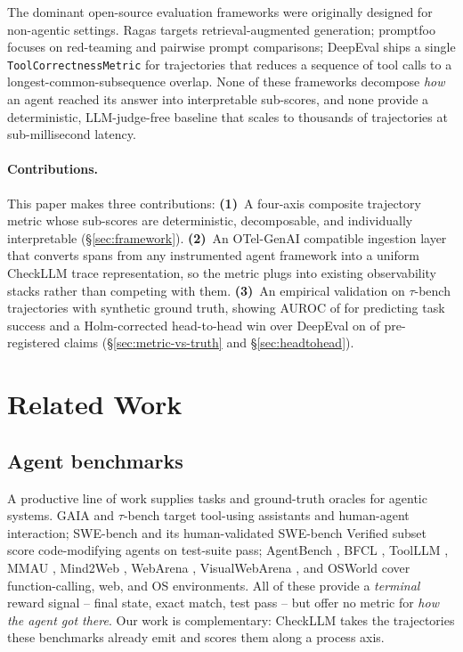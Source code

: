 \documentclass{article}
\begin{document}
The dominant open-source evaluation frameworks were originally
designed for non-agentic settings. Ragas \citep{es2024ragas} targets
retrieval-augmented generation; promptfoo \citep{promptfoo2024} focuses
on red-teaming and pairwise prompt comparisons; DeepEval
\citep{confidentai2024deepeval} ships a single
\texttt{ToolCorrectnessMetric} for trajectories that reduces a sequence
of tool calls to a longest-common-subsequence overlap. None of these
frameworks decompose \emph{how} an agent reached its answer into
interpretable sub-scores, and none provide a deterministic,
LLM-judge-free baseline that scales to thousands of trajectories at
sub-millisecond latency.

\paragraph{Contributions.} This paper makes three contributions:
\textbf{(1)}~A four-axis composite trajectory metric whose sub-scores
are deterministic, decomposable, and individually interpretable
(\S\ref{sec:framework}). \textbf{(2)}~An OTel-GenAI compatible
\citep{otelgenai2024} ingestion layer that converts spans from any
instrumented agent framework into a uniform CheckLLM trace
representation, so the metric plugs into existing observability stacks
rather than competing with them. \textbf{(3)}~An empirical validation
on \NTrajectories{} $\tau$-bench \citep{yao2024taubench} trajectories
with synthetic ground truth, showing AUROC of \AurocOverall{} for
predicting task success and a Holm-corrected
\citep{holm1979multiple} head-to-head win over DeepEval on
\HHClaimsSignificant{} of \HHClaimsCount{} pre-registered claims
(\S\ref{sec:metric-vs-truth} and \S\ref{sec:headtohead}).

\section{Related Work}
\label{sec:related}

\subsection{Agent benchmarks}
A productive line of work supplies tasks and ground-truth oracles
for agentic systems. GAIA \citep{mialon2023gaia} and $\tau$-bench
\citep{yao2024taubench} target tool-using assistants and
human-agent interaction; SWE-bench \citep{jimenez2024swebench} and its
human-validated SWE-bench Verified subset \citep{openai2024swebenchverified}
score code-modifying agents on test-suite pass; AgentBench
\citep{liu2024agentbench}, BFCL \citep{patil2025bfcl},
ToolLLM \citep{qin2023toolllm}, MMAU \citep{yin2024mmau},
Mind2Web \citep{deng2023mind2web}, WebArena \citep{zhou2024webarena},
VisualWebArena \citep{koh2024visualwebarena}, and OSWorld
\citep{xie2024osworld} cover function-calling, web, and OS
environments. All of these provide a \emph{terminal} reward signal --
final state, exact match, test pass -- but offer no metric for
\emph{how the agent got there}. Our work is complementary: CheckLLM
takes the trajectories these benchmarks already emit and scores them
along a process axis.
\end{document}
